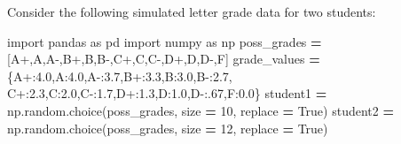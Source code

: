 \documentclass[
  12pt,
  krantz2]{krantz}
\makeatletter
\newenvironment{Shaded}{\begin{snugshade}}{\end{snugshade}}
\newcommand{\DecValTok}[1]{\textcolor[rgb]{0.06,0.06,0.06}{#1}}
\newcommand{\FloatTok}[1]{\textcolor[rgb]{0.06,0.06,0.06}{#1}}
\newcommand{\ImportTok}[1]{#1}
\newcommand{\NormalTok}[1]{#1}
\newcommand{\OperatorTok}[1]{\textcolor[rgb]{0.43,0.43,0.43}{\textbf{#1}}}
\newcommand{\StringTok}[1]{\textcolor[rgb]{0.5,0.5,0.5}{#1}}
\newcommand{\VariableTok}[1]{\textcolor[rgb]{0,0,0}{#1}}
\newenvironment{kframe}{%
\medskip{}
\setlength{\fboxsep}{.8em}
 \def\at@end@of@kframe{}%
 \ifinner\ifhmode%
  \def\at@end@of@kframe{\end{minipage}}%
  \begin{minipage}{\columnwidth}%
 \fi\fi%
 \def\FrameCommand##1{\hskip\@totalleftmargin \hskip-\fboxsep
 \colorbox{shadecolor}{##1}\hskip-\fboxsep
     \hskip-\linewidth \hskip-\@totalleftmargin \hskip\columnwidth}%
 \MakeFramed {\advance\hsize-\width
   \@totalleftmargin\z@ \linewidth\hsize
   \@setminipage}}%
 {\par\unskip\endMakeFramed%
 \at@end@of@kframe}
\renewenvironment{Shaded}{\begin{kframe}}{\end{kframe}}
\makeatother
\begin{document}
Consider the following simulated letter grade data for two students:

\begin{Shaded}
\begin{Highlighting}[]
\ImportTok{import}\NormalTok{ pandas }\ImportTok{as}\NormalTok{ pd}
\ImportTok{import}\NormalTok{ numpy }\ImportTok{as}\NormalTok{ np}
\NormalTok{poss\_grades }\OperatorTok{=}\NormalTok{ [}\StringTok{\textquotesingle{}A+\textquotesingle{}}\NormalTok{,}\StringTok{\textquotesingle{}A\textquotesingle{}}\NormalTok{,}\StringTok{\textquotesingle{}A{-}\textquotesingle{}}\NormalTok{,}\StringTok{\textquotesingle{}B+\textquotesingle{}}\NormalTok{,}\StringTok{\textquotesingle{}B\textquotesingle{}}\NormalTok{,}\StringTok{\textquotesingle{}B{-}\textquotesingle{}}\NormalTok{,}\StringTok{\textquotesingle{}C+\textquotesingle{}}\NormalTok{,}\StringTok{\textquotesingle{}C\textquotesingle{}}\NormalTok{,}\StringTok{\textquotesingle{}C{-}\textquotesingle{}}\NormalTok{,}\StringTok{\textquotesingle{}D+\textquotesingle{}}\NormalTok{,}\StringTok{\textquotesingle{}D\textquotesingle{}}\NormalTok{,}\StringTok{\textquotesingle{}D{-}\textquotesingle{}}\NormalTok{,}\StringTok{\textquotesingle{}F\textquotesingle{}}\NormalTok{]}
\NormalTok{grade\_values }\OperatorTok{=}\NormalTok{ \{}\StringTok{\textquotesingle{}A+\textquotesingle{}}\NormalTok{:}\FloatTok{4.0}\NormalTok{,}\StringTok{\textquotesingle{}A\textquotesingle{}}\NormalTok{:}\FloatTok{4.0}\NormalTok{,}\StringTok{\textquotesingle{}A{-}\textquotesingle{}}\NormalTok{:}\FloatTok{3.7}\NormalTok{,}\StringTok{\textquotesingle{}B+\textquotesingle{}}\NormalTok{:}\FloatTok{3.3}\NormalTok{,}\StringTok{\textquotesingle{}B\textquotesingle{}}\NormalTok{:}\FloatTok{3.0}\NormalTok{,}\StringTok{\textquotesingle{}B{-}\textquotesingle{}}\NormalTok{:}\FloatTok{2.7}\NormalTok{,}
                \StringTok{\textquotesingle{}C+\textquotesingle{}}\NormalTok{:}\FloatTok{2.3}\NormalTok{,}\StringTok{\textquotesingle{}C\textquotesingle{}}\NormalTok{:}\FloatTok{2.0}\NormalTok{,}\StringTok{\textquotesingle{}C{-}\textquotesingle{}}\NormalTok{:}\FloatTok{1.7}\NormalTok{,}\StringTok{\textquotesingle{}D+\textquotesingle{}}\NormalTok{:}\FloatTok{1.3}\NormalTok{,}\StringTok{\textquotesingle{}D\textquotesingle{}}\NormalTok{:}\FloatTok{1.0}\NormalTok{,}\StringTok{\textquotesingle{}D{-}\textquotesingle{}}\NormalTok{:}\FloatTok{.67}\NormalTok{,}\StringTok{\textquotesingle{}F\textquotesingle{}}\NormalTok{:}\FloatTok{0.0}\NormalTok{\}}
\NormalTok{student1 }\OperatorTok{=}\NormalTok{ np.random.choice(poss\_grades, size }\OperatorTok{=} \DecValTok{10}\NormalTok{, replace }\OperatorTok{=} \VariableTok{True}\NormalTok{)}
\NormalTok{student2 }\OperatorTok{=}\NormalTok{ np.random.choice(poss\_grades, size }\OperatorTok{=} \DecValTok{12}\NormalTok{, replace }\OperatorTok{=} \VariableTok{True}\NormalTok{)}
\end{Highlighting}
\end{Shaded}
\end{document}
